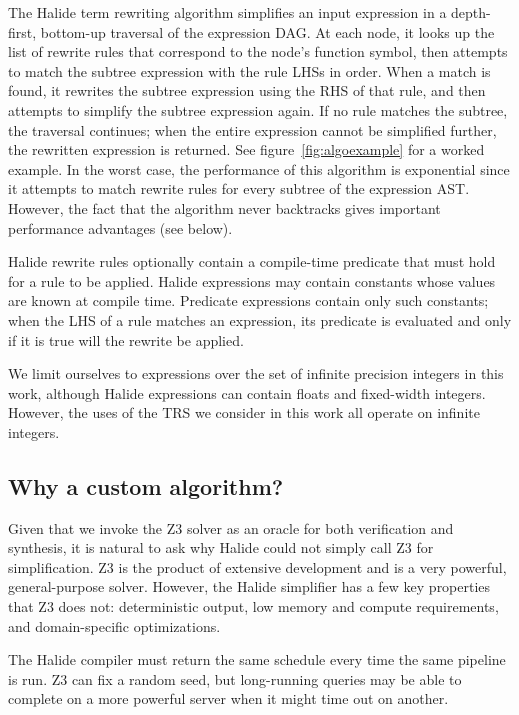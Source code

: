 \documentclass[sigplan,10pt,review,anonymous]{acmart}\settopmatter{printfolios=true,printccs=false,printacmref=false}
\begin{document}
The Halide term rewriting algorithm simplifies an input expression in a
depth-first, bottom-up traversal of the expression DAG. At each node, it looks
up the list of rewrite rules that correspond to the node's function symbol, then
attempts to match the subtree expression with the rule LHSs in order. When a
match is found, it rewrites the subtree expression using the RHS of that rule,
and then attempts to simplify the subtree expression again. If no rule matches
the subtree, the traversal continues; when the entire expression cannot be
simplified further, the rewritten expression is returned. See figure~\ref{fig:algoexample} for a worked example. 
In the worst case, the performance of this algorithm is exponential since it attempts to match rewrite rules for every subtree of the expression AST. However, the fact that the algorithm never backtracks gives important performance advantages (see below).

Halide rewrite rules optionally contain a compile-time predicate that must hold for a rule to
be applied. Halide expressions may contain constants whose values are known at
compile time. Predicate expressions contain only such constants; when the
LHS of a rule matches an expression, its predicate is evaluated and only if it
is true will the rewrite be applied.

We limit ourselves to expressions over the set of infinite precision integers in
this work, although Halide expressions can contain floats and fixed-width
integers. However, the uses of the TRS we consider in this work all operate
on infinite integers.

\subsection{Why a custom algorithm?}

Given that we invoke the Z3 solver as an oracle for both verification and synthesis, it is natural to ask why Halide could not simply call Z3 for simplification. Z3 is the product of extensive development and is a very powerful, general-purpose solver. However, the Halide simplifier has a few key properties that Z3 does not: deterministic output, low memory and compute requirements, and domain-specific optimizations.

The Halide compiler must return the same schedule every time the same pipeline is run. Z3 can fix a random seed, but long-running queries may be able to complete on a more powerful server when it might time out on another.
\end{document}
